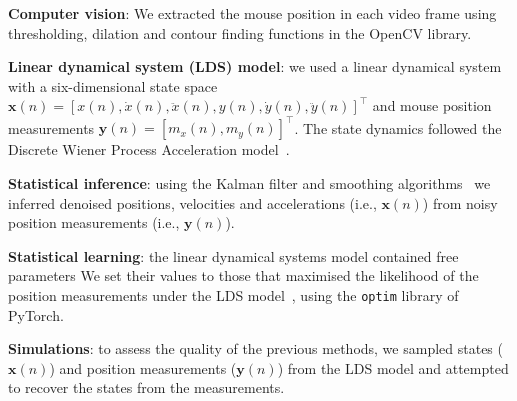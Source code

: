 
\noindent\textbf{Computer vision}: 
%
We extracted the mouse position in each video frame using thresholding,
dilation and contour finding functions in the OpenCV library.

\noindent\textbf{Linear dynamical system (LDS) model}:
%
we used a linear dynamical system with a six-dimensional state space
$\mathbf{x}(n)=[x(n), \dot{x}(n), \ddot{x}(n), y(n), \dot{y}(n),
\ddot{y}(n)]^\intercal$ and mouse position measurements $\mathbf{y}(n)=[m_x(n),
m_y(n)]^\intercal$.  The state dynamics followed the Discrete Wiener
Process Acceleration model~\cite{c1}.

\noindent\textbf{Statistical inference}:
%
using the Kalman filter and smoothing algorithms~\cite{c2} we
inferred denoised positions, velocities and accelerations (i.e., $\mathbf{x}(n)$)
from noisy position measurements (i.e., $\mathbf{y}(n)$).

\noindent\textbf{Statistical learning}:
%
the linear dynamical systems model contained free parameters We set their values
to those that maximised the likelihood of the position measurements under the
LDS model~\cite{c2}, using the \texttt{optim} library of PyTorch.

\noindent\textbf{Simulations}:
%
to assess the quality of the previous methods, we sampled states
($\mathbf{x}(n)$) and position measurements ($\mathbf{y}(n)$) from the LDS
model and attempted to recover the states from the measurements.
